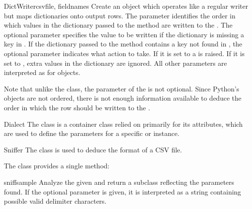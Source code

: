 \begin{classdesc}{DictWriter}{csvfile, fieldnames}
Create an object which operates like a regular writer but maps dictionaries
onto output rows.  The  parameter identifies the order in
which values in the dictionary passed to the  method are
written to the .  The optional  parameter
specifies the value to be written if the dictionary is missing a key in
.  If the dictionary passed to the 
method contains a key not found in , the optional
 parameter indicates what action to take.  If it is set
to  a  is raised.  If it is set to
, extra values in the dictionary are ignored.  All other
parameters are interpreted as for  objects.

Note that unlike the  class, the 
parameter of the  is not optional.  Since Python's
 objects are not ordered, there is not enough information
available to deduce the order in which the row should be written to the
.

\end{classdesc}

\begin{classdesc*}{Dialect}{}
The  class is a container class relied on primarily for its
attributes, which are used to define the parameters for a specific
 or  instance.
\end{classdesc*}

\begin{classdesc}{Sniffer}{}
The  class is used to deduce the format of a CSV file.
\end{classdesc}

The  class provides a single method:

\begin{methoddesc}{sniff}{sample}
Analyze the given  and return a  subclass
reflecting the parameters found.  If the optional  parameter
is given, it is interpreted as a string containing possible valid delimiter
characters.
\end{methoddesc}

